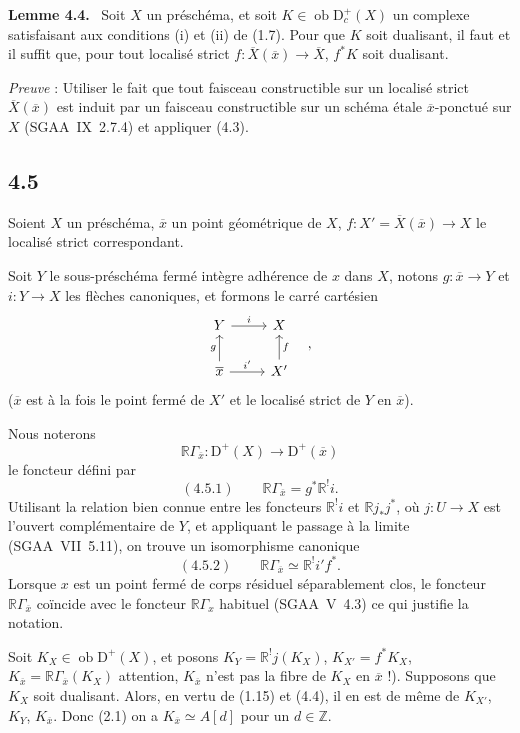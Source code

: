 \documentclass[11pt]{article}
\newenvironment{statement}[1]{\par\medskip\noindent\textbf{#1.}\ }{\par\medskip}
\newcommand{\R}{\mathbb{R}}\newcommand{\RHomCore}{\mathbb{R}\mathrm{Hom}}
\newcommand{\D}{\mathrm{D}}
\newcommand{\Z}{\mathbb{Z}}
\newcommand{\ob}{\operatorname{ob}}
\newcommand{\ol}[1]{\overline{#1}}
\providecommand{\ob}{\operatorname{ob}}
\providecommand{\R}{\mathrm R}
\providecommand{\Z}{\mathbb Z}
\begin{document}
\begin{statement}{Lemme 4.4}
Soit $X$ un préschéma, et soit $K\in\ob\D_c^+(X)$ un complexe satisfaisant aux conditions (i) et (ii) de (1.7). Pour que $K$ soit dualisant, il faut et il suffit que, pour tout localisé strict $f:\ol{X}(\ol{x})\to \ol{X}$, $f^*K$ soit dualisant.
\end{statement}

\emph{Preuve} : Utiliser le fait que tout faisceau constructible sur un localisé strict $\ol{X}(\ol{x})$ est induit par un faisceau constructible sur un schéma étale $\ol{x}$-ponctué sur $X$ (SGAA~IX~2.7.4) et appliquer (4.3).

\subsection*{4.5}
Soient $X$ un préschéma, $\ol{x}$ un point géométrique de $X$, $f:X'=\ol{X}(\ol{x})\to X$ le localisé strict correspondant.

Soit $Y$ le sous-préschéma fermé intègre adhérence de $x$ dans $X$, notons $g:\ol{x}\to Y$ et $i:Y\to X$ les flèches canoniques, et formons le carré cartésien
\[
\begin{tikzcd}
Y \arrow[r,"i"] & X \\
\ol{x} \arrow[u,"g"] \arrow[r,"i'"] & X' \arrow[u,"f"']
\end{tikzcd}\quad ,
\]
($\ol{x}$ est à la fois le point fermé de $X'$ et le localisé strict de $Y$ en $\ol{x}$).

Nous noterons
\[
\R\Gamma_{\ol{x}}:\D^+(X)\longrightarrow \D^+(\ol{x})
\]
le foncteur défini par
\[
(4.5.1)\qquad \R\Gamma_{\ol{x}}=g^*\R^{!}i.
\]
Utilisant la relation bien connue entre les foncteurs $\R^{!}i$ et $\R j_*j^*$, où $j:U\to X$ est l'ouvert complémentaire de $Y$, et appliquant le passage à la limite (SGAA~VII~5.11), on trouve un isomorphisme canonique
\[
(4.5.2)\qquad \R\Gamma_{\ol{x}}\simeq\R^{!}i' f^*.
\]
Lorsque $x$ est un point fermé de corps résiduel séparablement clos, le foncteur $\R\Gamma_{\ol{x}}$ coïncide avec le foncteur $\R\Gamma_x$ habituel (SGAA~V~4.3) ce qui justifie la notation.

Soit $K_X\in\ob\D^+(X)$, et posons $K_Y=\R^{!}j(K_X)$, $K_{X'}=f^*K_X$, $K_{\ol{x}}=\R\Gamma_{\ol{x}}(K_X)$ attention, $K_{\ol{x}}$ n'est pas la fibre de $K_X$ en $\ol{x}$ !). Supposons que $K_X$ soit dualisant. Alors, en vertu de (1.15) et (4.4), il en est de même de $K_{X'}$, $K_Y$, $K_{\ol{x}}$. Donc (2.1) on a $K_{\ol{x}}\simeq A[d]$ pour un $d\in\Z$.
\end{document}
